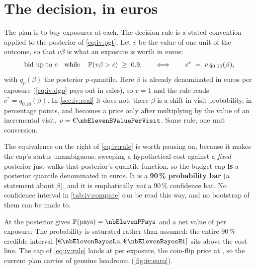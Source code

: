 \section{The decision, in euros}
\label{sec:iv:euro}

The plan is to buy exposures at \eur{\nbElevenCost} each. The decision rule is a stated convention
applied to the posterior of \cref{eq:iv:pgt}. Let $v$ be the value of one unit of the outcome, so
that $v\beta$ is what an exposure is worth in euros:
%
\begin{equation}
  \text{bid up to } c \quad\text{while}\quad \operatorname{\mathbb{P}}(v\beta > c) \;\ge\; 0.9,
  \qquad\Longleftrightarrow\qquad
  c^{*} \;=\; v\,q_{0.10}(\beta),
  \label{eq:iv:rule}
\end{equation}
%
with $q_p(\beta)$ the posterior $p$-quantile. Here $\beta$ is already denominated in euros per
exposure (\cref{eq:iv:dgp} pays out in sales), so $v = 1$ and the rule reads
$c^{*} = q_{0.10}(\beta)$. In \cref{sec:iv:real} it does not: there $\beta$ is a shift in visit
probability, in percentage points, and becomes a price only after multiplying by the value of an
incremental visit, $v = \eur{\nbElevenBValuePerVisit}$. Same rule, one unit conversion.

The equivalence on the right of \cref{eq:iv:rule} is worth pausing on, because it makes the cap's
status unambiguous: sweeping a hypothetical cost against a \emph{fixed} posterior just walks that
posterior's quantile function, so the budget cap \textbf{is} a posterior quantile denominated in
euros. It is a \textbf{90\,\% probability bar} (a statement about $\beta$), and it is
emphatically \emph{not} a 90\,\% confidence bar. No confidence interval in \cref{tab:iv:compare} can
be read this way, and no bootstrap of them can be made to.

At \eur{\nbElevenCost} the posterior gives $\Prob(\text{pays}) = \nbElevenPPays$ and a net value of
\eur{\nbElevenNet} per exposure. The probability is saturated rather than assumed: the entire
90\,\% credible interval $[\eur{\nbElevenBayesLo}, \eur{\nbElevenBayesHi}]$ sits above the cost
line. The cap of \cref{eq:iv:rule} lands at \eur{\nbElevenCap} per exposure, the coin-flip price at
\eur{\nbElevenCoinflip}, so the current plan carries \eur{\nbElevenHeadroom} of genuine headroom
(\cref{fig:iv:euro}).

